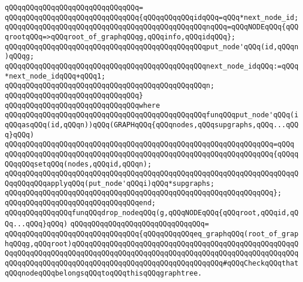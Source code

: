 \verb|qQQqqQQqqQQqqQQqqQQqqQQqqQQqqQQq=|\newline
\verb|qQQqqQQqqQQqqQQqqQQqqQQqqQQqqQQq{qQQqqQQqqQQqidqQQq=qQQq*next_node_id;|\newline
\newline
\verb|qQQqqQQqqQQqqQQqqQQqqQQqqQQqqQQqqQQqqQQqqQQqqQQqnqQQq=qQQqNODEqQQq{qQQqrootqQQq=>qQQqroot_of_graphqQQqg,qQQqinfo,qQQqidqQQq};|\newline
\newline
\verb|qQQqqQQqqQQqqQQqqQQqqQQqqQQqqQQqqQQqqQQqqQQqqQQqput_node'qQQq(id,qQQqn)qQQqg;|\newline
\newline
\verb|qQQqqQQqqQQqqQQqqQQqqQQqqQQqqQQqqQQqqQQqqQQqqQQqnext_node_idqQQq:=qQQq*next_node_idqQQq+qQQq1;|\newline
\newline
\verb|qQQqqQQqqQQqqQQqqQQqqQQqqQQqqQQqqQQqqQQqqQQqqQQqn;|\newline
\verb|qQQqqQQqqQQqqQQqqQQqqQQqqQQqqQQq}|\newline
\verb|qQQqqQQqqQQqqQQqqQQqqQQqqQQqqQQqwhere|\newline
\verb|qQQqqQQqqQQqqQQqqQQqqQQqqQQqqQQqqQQqqQQqqQQqqQQqfunqQQqput_node'qQQq(iqQQqasqQQq(id,qQQqn))qQQq(GRAPHqQQq{qQQqnodes,qQQqsupgraphs,qQQq...qQQq}qQQq)|\newline
\verb|qQQqqQQqqQQqqQQqqQQqqQQqqQQqqQQqqQQqqQQqqQQqqQQqqQQqqQQqqQQqqQQq=qQQq|\newline
\verb|qQQqqQQqqQQqqQQqqQQqqQQqqQQqqQQqqQQqqQQqqQQqqQQqqQQqqQQqqQQqqQQq{qQQqqQQqqQQqsetqQQq(nodes,qQQqid,qQQqn);|\newline
\newline
\verb|qQQqqQQqqQQqqQQqqQQqqQQqqQQqqQQqqQQqqQQqqQQqqQQqqQQqqQQqqQQqqQQqqQQqqQQqqQQqqQQqapplyqQQq(put_node'qQQqi)qQQq*supgraphs;|\newline
\verb|qQQqqQQqqQQqqQQqqQQqqQQqqQQqqQQqqQQqqQQqqQQqqQQqqQQqqQQqqQQqqQQq};|\newline
\verb|qQQqqQQqqQQqqQQqqQQqqQQqqQQqqQQqend;|\newline
\newline
\verb|qQQqqQQqqQQqqQQqfunqQQqdrop_nodeqQQq(g,qQQqNODEqQQq{qQQqroot,qQQqid,qQQq...qQQq}qQQq)|\newline
\verb|qQQqqQQqqQQqqQQqqQQqqQQqqQQqqQQq=|\newline
\verb|qQQqqQQqqQQqqQQqqQQqqQQqqQQqqQQq{qQQqqQQqqQQqeq_graphqQQq(root_of_graphqQQqg,qQQqroot)qQQqqQQqqQQqqQQqqQQqqQQqqQQqqQQqqQQqqQQqqQQqqQQqqQQqqQQqqQQqqQQqqQQqqQQqqQQqqQQqqQQqqQQqqQQqqQQqqQQqqQQqqQQqqQQqqQQqqQQqqQQqqQQqqQQqqQQqqQQqqQQqqQQqqQQqqQQqqQQqqQQqqQQqqQQqqQQq#qQQqCheckqQQqthatqQQqnodeqQQqbelongsqQQqtoqQQqthisqQQqgraphtree.|\newline

